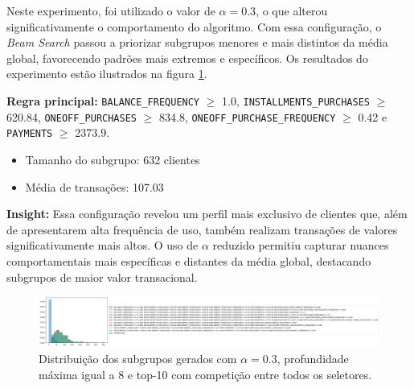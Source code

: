 \documentclass[12pt]{article}
\begin{document}
\hspace{1.2cm}Neste experimento, foi utilizado o valor de $\alpha = 0.3$, o que alterou significativamente o comportamento do algoritmo. Com essa configuração, o \textit{Beam Search} passou a priorizar subgrupos menores e mais distintos da média global, favorecendo padrões mais extremos e específicos. Os resultados do experimento estão ilustrados na figura \ref{fig:experimento21}.

\textbf{Regra principal:} \texttt{BALANCE\_FREQUENCY} $\geq$ 1.0, \texttt{INSTALLMENTS\_PURCHASES} $\geq$ 620.84, \texttt{ONEOFF\_PURCHASES} $\geq$ 834.8, \texttt{ONEOFF\_PURCHASE\_FREQUENCY} $\geq$ 0.42 e \texttt{PAYMENTS} $\geq$ 2373.9.
\begin{itemize}
    \item Tamanho do subgrupo: 632 clientes
    \item Média de transações: 107.03
\end{itemize}

\textbf{Insight:} Essa configuração revelou um perfil mais exclusivo de clientes que, além de apresentarem alta frequência de uso, também realizam transações de valores significativamente mais altos. O uso de $\alpha$ reduzido permitiu capturar nuances comportamentais mais específicas e distantes da média global, destacando subgrupos de maior valor transacional.

\begin{figure}[h] \centering
    \includegraphics[width=1\textwidth]{imagens/experimento2.1.png}
    \caption{Distribuição dos subgrupos gerados com $\alpha = 0.3$, profundidade máxima igual a 8 e top-10 com competição entre todos os seletores.}
    \label{fig:experimento21}
\end{figure}
\end{document}
